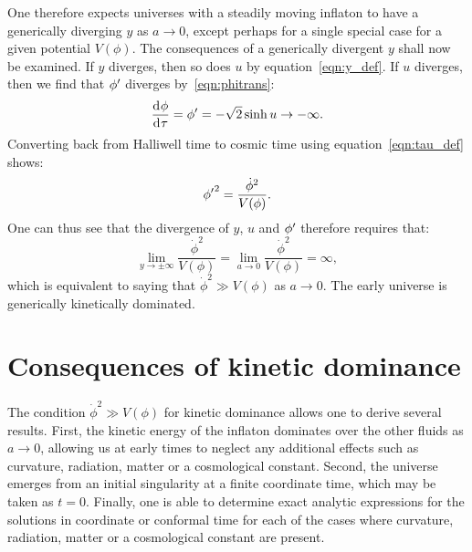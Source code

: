 One therefore expects universes with a steadily moving inflaton to have a generically diverging \(y\) as \(a\to0\), except perhaps for a single special case for a given potential \(V(\phi)\).  The consequences of a generically divergent \(y\) shall now be examined.  If \(y\) diverges, then so does \(u\) by equation~\eqref{eqn:y_def}. If \(u\) diverges, then we find that \({{\phi}^\prime}\) diverges by~\eqref{eqn:phitrans}:
\begin{equation}
  \frac{\operatorname{d}^{}\!{\phi}}{\operatorname{d}^{}\!{\tau}}={{\phi}^\prime} 
  = 
  -\sqrt{2}\sinh u\rightarrow -\infty.
\end{equation}
Converting back from Halliwell time to cosmic time using equation~\eqref{eqn:tau_def} shows:
\begin{equation}
  {{\phi}^\prime}^2 
  = 
  \frac{\dot{\phi}^2}{V(\phi)}.
\end{equation}
One can thus see that the divergence of \(y\), \(u\) and \({{\phi}^\prime}\) therefore requires that:
\begin{equation}
  \lim\limits_{y\to\pm\infty} \frac{\dot\phi^2}{V(\phi)}
  =
  \lim\limits_{a\to 0} \frac{\dot\phi^2}{V(\phi)} = \infty,
  \label{eqn:kdfinal}
\end{equation}
which is equivalent to saying that \(\dot{\phi}^2\gg V(\phi)\) as
\(a\to0\). The early universe is generically kinetically dominated.

\section{Consequences of kinetic dominance}
\label{sec:consequences_of_kinetic_dominance}

The condition \(\dot\phi^2\gg V(\phi)\) for kinetic dominance allows one to derive several results. First, the kinetic energy of the inflaton dominates over the other fluids as \(a\to 0\), allowing us at early times to neglect any additional effects such as curvature, radiation, matter or a cosmological constant. Second, the universe emerges from an initial singularity at a finite coordinate time, which may be taken as \(t=0\). Finally, one is able to determine exact analytic expressions for the solutions in coordinate or conformal time for each of the cases where curvature, radiation, matter or a cosmological constant are present.


